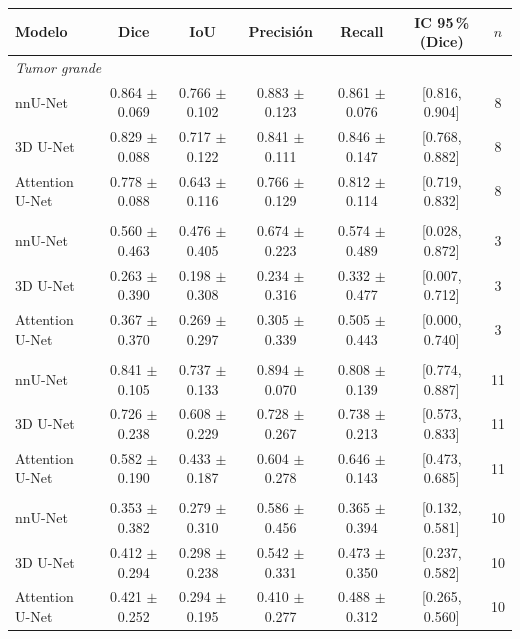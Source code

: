 \footnotesize
\begin{tabular}{lccccc c}
\toprule
Modelo & Dice & IoU & Precisión & Recall & IC 95\,\% (Dice) & $n$ \\
\midrule
\multicolumn{7}{l}{\itshape Tumor grande} \\
nnU-Net & 0.864 $\pm$ 0.069 & 0.766 $\pm$ 0.102 & 0.883 $\pm$ 0.123 & 0.861 $\pm$ 0.076 & [0.816, 0.904] & 8 \\
3D U-Net & 0.829 $\pm$ 0.088 & 0.717 $\pm$ 0.122 & 0.841 $\pm$ 0.111 & 0.846 $\pm$ 0.147 & [0.768, 0.882] & 8 \\
Attention U-Net & 0.778 $\pm$ 0.088 & 0.643 $\pm$ 0.116 & 0.766 $\pm$ 0.129 & 0.812 $\pm$ 0.114 & [0.719, 0.832] & 8 \\
\addlinespace
\multicolumn{7}{l}{\itshape Tumor pequeño} \\
nnU-Net & 0.560 $\pm$ 0.463 & 0.476 $\pm$ 0.405 & 0.674 $\pm$ 0.223 & 0.574 $\pm$ 0.489 & [0.028, 0.872] & 3 \\
3D U-Net & 0.263 $\pm$ 0.390 & 0.198 $\pm$ 0.308 & 0.234 $\pm$ 0.316 & 0.332 $\pm$ 0.477 & [0.007, 0.712] & 3 \\
Attention U-Net & 0.367 $\pm$ 0.370 & 0.269 $\pm$ 0.297 & 0.305 $\pm$ 0.339 & 0.505 $\pm$ 0.443 & [0.000, 0.740] & 3 \\
\addlinespace
\multicolumn{7}{l}{\itshape Tamaño mixto} \\
nnU-Net & 0.841 $\pm$ 0.105 & 0.737 $\pm$ 0.133 & 0.894 $\pm$ 0.070 & 0.808 $\pm$ 0.139 & [0.774, 0.887] & 11 \\
3D U-Net & 0.726 $\pm$ 0.238 & 0.608 $\pm$ 0.229 & 0.728 $\pm$ 0.267 & 0.738 $\pm$ 0.213 & [0.573, 0.833] & 11 \\
Attention U-Net & 0.582 $\pm$ 0.190 & 0.433 $\pm$ 0.187 & 0.604 $\pm$ 0.278 & 0.646 $\pm$ 0.143 & [0.473, 0.685] & 11 \\
\addlinespace
\multicolumn{7}{l}{\itshape Híbrido} \\
nnU-Net & 0.353 $\pm$ 0.382 & 0.279 $\pm$ 0.310 & 0.586 $\pm$ 0.456 & 0.365 $\pm$ 0.394 & [0.132, 0.581] & 10 \\
3D U-Net & 0.412 $\pm$ 0.294 & 0.298 $\pm$ 0.238 & 0.542 $\pm$ 0.331 & 0.473 $\pm$ 0.350 & [0.237, 0.582] & 10 \\
Attention U-Net & 0.421 $\pm$ 0.252 & 0.294 $\pm$ 0.195 & 0.410 $\pm$ 0.277 & 0.488 $\pm$ 0.312 & [0.265, 0.560] & 10 \\
\bottomrule
\end{tabular}%
